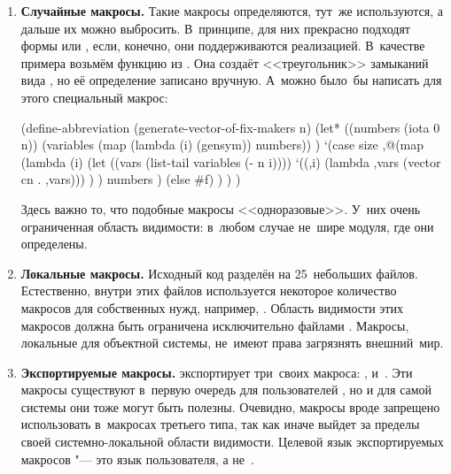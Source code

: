\begin{enumerate}
  \item \textbf{Случайные макросы.} Такие макросы определяются, тут~же
        используются, а дальше их можно выбросить. В~принципе, для них
        прекрасно подходят формы  или , если,
        конечно, они поддерживаются реализацией. В~качестве примера
        возьмём функцию  из {\Meroonet}. Она создаёт
        <<треугольник>> замыканий вида , но её определение записано вручную.
        А~можно было~бы написать для этого специальный макрос:

\begin{code:lisp}
(define-abbreviation (generate-vector-of-fix-makers n)
  (let* ((numbers (iota 0 n))
         (variables (map (lambda (i) (gensym)) numbers)) )
    `(case size
       ,@(map (lambda (i)
                (let ((vars (list-tail variables (- n i))))
                  `((,i) (lambda ,vars (vector cn . ,vars))) ) )
              numbers )
       (else #f) ) ) )
\end{code:lisp}

        \noindent
        Здесь важно то, что подобные макросы <<одноразовые>>. У~них
        очень ограниченная область видимости: в~любом случае не~шире
        модуля, где они определены.

  \item \textbf{Локальные макросы.} Исходный код {\Meroon} разделён на
        25~небольших файлов. Естественно, внутри этих файлов используется
        некоторое количество макросов для собственных нужд, например,
        . Область видимости этих макросов должна быть ограничена
        исключительно файлами {\Meroon}. Макросы, локальные для объектной
        системы, не~имеют права загрязнять внешний~мир.

  \item \textbf{Экспортируемые макросы.} {\Meroon} экспортирует три~своих
        макроса: ,  и~.
        Эти макросы существуют в~первую очередь для пользователей {\Meroon},
        но и для самой системы они тоже могут быть полезны. Очевидно,
        макросы вроде  запрещено использовать в~макросах третьего
        типа, так как иначе  выйдет за пределы своей
        системно-локальной области видимости. Целевой язык экспортируемых
        макросов "--- это язык пользователя, а не~{\Meroon}.
\end{enumerate}

